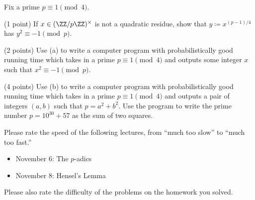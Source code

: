 \documentclass[../notes.tex]{subfiles}
\begin{document}
\begin{prob}[7 points] \label{prob:sum-of-squares}
	Fix a prime $p\equiv1\pmod4$.
	\begin{listalph}
		\item (1 point) If $x\in(\ZZ/p\ZZ)^\times$ is not a quadratic residue, show that $y\coloneqq x^{(p-1)/4}$ has $y^2\equiv-1\pmod p$.
		\item (2 points) Use (a) to write a computer program with probabilistically good running time which takes in a prime $p\equiv1\pmod4$ and outputs some integer $x$ such that $x^2\equiv-1\pmod p$.
		\item (4 points) Use (b) to write a computer program with probabilistically good running time which takes in a prime $p\equiv1\pmod4$ and outputs a pair of integers $(a,b)$ such that $p=a^2+b^2$. Use the program to write the prime number $p=10^{30}+57$ as the sum of two squares.
	\end{listalph}
\end{prob}
\begin{prob}[0 points]
	Please rate the speed of the following lectures, from ``much too slow'' to ``much too fast.''
	\begin{itemize}
		\item November 6: The $p$-adics
		\item November 8: Hensel's Lemma
	\end{itemize}
	Please also rate the difficulty of the problems on the homework you solved.
\end{prob}
\end{document}
